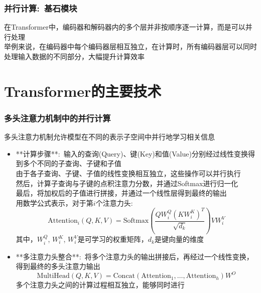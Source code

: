 \begin{frame}
    \frametitle{并行计算:~基石模块}
    在\textrm{Transformer}中，编码器和解码器内的多个层并非按顺序逐一计算，而是可以并行处理\\
    举例来说，在编码器中每个编码器层相互独立，在计算时，所有编码器层可以同时处理输入数据的不同部分，大幅提升计算效率
\end{frame}

\section{\rm{Transformer}的主要技术}
\begin{frame}
    \frametitle{多头注意力机制中的并行计算}
    多头注意力机制允许模型在不同的表示子空间中并行地学习相关信息
    \begin{itemize}
	    \item **计算步骤**:~输入的查询\textrm{(Query)}、键\textrm{(Key)}和值\textrm{(Value)}分别经过线性变换得到多个不同的子查询、子键和子值\\
		    由于各子查询、子键、子值的线性变换相互独立，这些操作可以并行执行\\
		    然后，计算子查询与子键的点积注意力分数，并通过\textrm{Softmax}进行归一化\\
		    最后，将加权后的子值进行拼接，并通过一个线性层得到最终的输出\\

		    用数学公式表示，对于第$i$个注意力头:~
		    \begin{displaymath}
			    \text{Attention}_i(Q, K, V) = \text{Softmax}(\frac{Q W_i^Q (K W_i^K)^T}{\sqrt{d_k}}) V W_i^V 
		    \end{displaymath}
        其中，$W_i^Q$, $W_i^K$, $W_i^V$是可学习的权重矩阵，$d_k$是键向量的维度
        \item **多注意力头整合**:~将多个注意力头的输出拼接后，再经过一个线性变换，得到最终的多头注意力输出
		\begin{displaymath}
			\text{MultiHead}(Q, K, V) = \text{Concat}(\text{Attention}_1, \ldots, \text{Attention}_h) W^O
		\end{displaymath}
        多个注意力头之间的计算过程相互独立，能够同时进行
    \end{itemize}
\end{frame}

